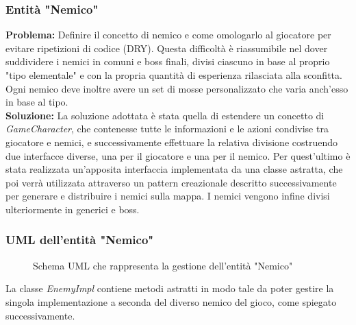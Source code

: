 \documentclass[a4paper,12pt]{report}
\begin{document}
\subsubsection{Entità "Nemico"} \label{ss:enemy}
\textbf{Problema:} Definire il concetto di nemico e come omologarlo al giocatore per evitare ripetizioni di codice (DRY).
Questa difficoltà è riassumibile nel dover suddividere i nemici in comuni e boss finali, divisi ciascuno in base al proprio "tipo elementale" e con la propria quantità di esperienza rilasciata alla sconfitta. Ogni nemico deve inoltre avere un set di mosse personalizzato che varia anch'esso in base al tipo.\\
\textbf{Soluzione:} La soluzione adottata è stata quella di estendere un concetto di \textit{GameCharacter}, che contenesse tutte le informazioni e le azioni condivise tra giocatore e nemici, e successivamente effettuare la relativa divisione costruendo due interfacce diverse, una per il giocatore e una per il nemico. Per quest'ultimo è stata realizzata un'apposita interfaccia implementata da una classe astratta, che poi verrà utilizzata attraverso un pattern creazionale descritto successivamente per generare e distribuire i nemici sulla mappa. I nemici vengono infine divisi ulteriormente in generici e boss.
\subsubsection{UML dell'entità "Nemico"}
\begin{figure}[H]
	\centering
	
	\caption{Schema UML che rappresenta la gestione dell'entità "Nemico"} 
	\label{fig:Schema UML dell'entità nemico}
\end{figure}
La classe \textit{EnemyImpl} contiene metodi astratti in modo tale da poter gestire la singola implementazione a seconda del diverso nemico del gioco, come spiegato successivamente.
\end{document}
